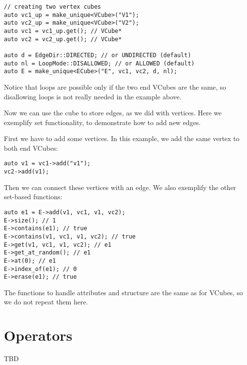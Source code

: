 \begin{lstlisting}[style=c++]
// creating two vertex cubes
auto vc1_up = make_unique<VCube>("V1");
auto vc2_up = make_unique<VCube>("V2");
auto vc1 = vc1_up.get(); // VCube*
auto vc2 = vc2_up.get(); // VCube*

auto d = EdgeDir::DIRECTED; // or UNDIRECTED (default)
auto nl = LoopMode::DISALLOWED; // or ALLOWED (default)
auto E = make_unique<ECube>("E", vc1, vc2, d, nl);
\end{lstlisting}
Notice that loops are possible only if the two end VCubes are the same, so disallowing loops is not really needed in the example above.

Now we can use the cube to store edges, as we did with vertices. Here we exemplify set functionality, to demonstrate how to add new edges. 

First we have to add some vertices. In this example, we add the same vertex to both end VCubes:
\begin{lstlisting}[style=c++]
auto v1 = vc1->add("v1");
vc2->add(v1);
\end{lstlisting}
Then we can connect these vertices with an edge. We also exemplify the other set-based functions:
\begin{lstlisting}[style=c++]
auto e1 = E->add(v1, vc1, v1, vc2);
E->size(); // 1
E->contains(e1); // true
E->contains(v1, vc1, v1, vc2); // true
E->get(v1, vc1, v1, vc2); // e1
E->get_at_random(); // e1
E->at(0); // e1
E->index_of(e1); // 0
E->erase(e1); // true
\end{lstlisting}
The functions to handle attributes and structure are the same as for VCubes, so we do not repeat them here.

\section{Operators}

TBD


